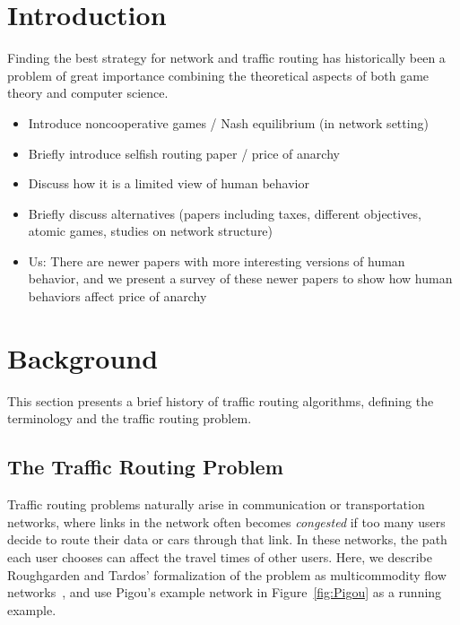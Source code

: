 \documentclass[acmlarge]{acmart}
\begin{document}
\section{Introduction}
Finding the best strategy for network and traffic routing has historically been a problem of great importance combining the theoretical aspects of both game theory and computer science. 
\begin{itemize}
    \item Introduce noncooperative games / Nash equilibrium (in network setting)
    \item Briefly introduce selfish routing paper / price of anarchy
    \item Discuss how it is a limited view of human behavior
    \item Briefly discuss alternatives (papers including taxes, different objectives, atomic games, studies on network structure)
    \item Us: There are newer papers with more interesting versions of human behavior, and we present a survey of these newer papers to show how human behaviors affect price of anarchy
\end{itemize}

\section{Background}
This section presents a brief history of traffic routing algorithms, defining the terminology
and the traffic routing problem.

\subsection{The Traffic Routing Problem}
Traffic routing problems naturally arise in communication or transportation networks, where
links in the network often becomes \emph{congested} if too many users decide to route their data 
or cars through that link. In these networks, the path each user chooses can affect the travel times of other
users. Here, we describe Roughgarden and Tardos' formalization of the problem as multicommodity flow networks~\cite{tardos,roughgarden}, and use Pigou's example network in Figure~\ref{fig:Pigou} as a running example.
\end{document}
